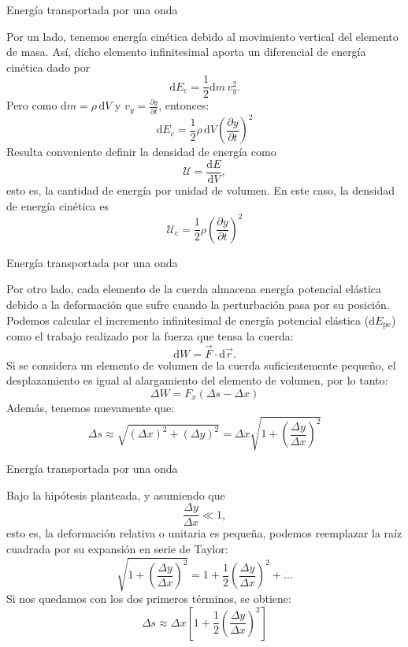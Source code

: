 \documentclass[11pt,handout,aspectratio=1610]{beamer}
\newcommand{\diff}[0]{\text{d}}
\newcommand{\fdiff}[2]{\dfrac{\text{d} #1}{\text{d} #2}}
\newcommand{\pdiff}[2]{\frac{\partial #1}{\partial #2}}
\begin{document}
\begin{frame}{Energía transportada por una onda}

    Por un lado, tenemos energía cinética debido al movimiento vertical del elemento de masa. Así, dicho elemento infinitesimal aporta un diferencial de energía cinética dado por $$ \diff E_\text{c} = \frac{1}{2} \diff m \, v_y^2. $$ Pero como $\diff m = \rho \, \diff V $ y $v_y = \pdiff{y}{t}$, entonces: $$ \diff E_\text{c} = \frac{1}{2} \rho \, \diff V \left(\pdiff{y}{t}\right)^2 $$ Resulta conveniente definir la densidad de energía como $$ \mathcal{U} = \fdiff{E}{V}, $$ esto es, la cantidad de energía por unidad de volumen. En este caso, la densidad de energía cinética es $$ \mathcal{U}_\text{c} = \frac{1}{2} \rho \left(\pdiff{y}{t}\right)^2 $$

\end{frame}

\begin{frame}{Energía transportada por una onda}

    Por otro lado, cada elemento de la cuerda almacena energía potencial elástica debido a la deformación que sufre cuando la perturbación pasa por su posición. Podemos calcular el incremento infinitesimal de energía potencial elástica ($\diff E_\text{pe}$) como el trabajo realizado por la fuerza que tensa la cuerda: $$\diff W = \vec{F} \cdot \diff \vec{r}.$$ Si se considera un elemento de volumen de la cuerda suficientemente pequeño, el desplazamiento es igual al alargamiento del elemento de volumen, por lo tanto: $$ \Delta W = F_x \left(\Delta s - \Delta x\right)$$ Además, tenemos nuevamente que: $$ \Delta s \approx \sqrt{\left(\Delta x\right)^2 + \left(\Delta y\right)^2} = \Delta x \sqrt{1 + \left(\frac{\Delta y}{\Delta x}\right)^2}$$

\end{frame}

\begin{frame}{Energía transportada por una onda}

    Bajo la hipótesis planteada, y asumiendo que $$ \frac{\Delta y}{\Delta x} \ll 1, $$ esto es, la deformación relativa o unitaria es pequeña, podemos reemplazar la raíz cuadrada por su expansión en serie de Taylor: $$ \sqrt{1 + \left(\frac{\Delta y}{\Delta x}\right)^2} = 1 + \frac{1}{2} \left(\frac{\Delta y}{\Delta x}\right)^2 + \ldots$$ Si nos quedamos con los dos primeros términos, se obtiene: $$  \Delta s \approx \Delta x \left[1 + \frac{1}{2} \left(\frac{\Delta y}{\Delta x}\right)^2\right] $$

\end{frame}
\end{document}
